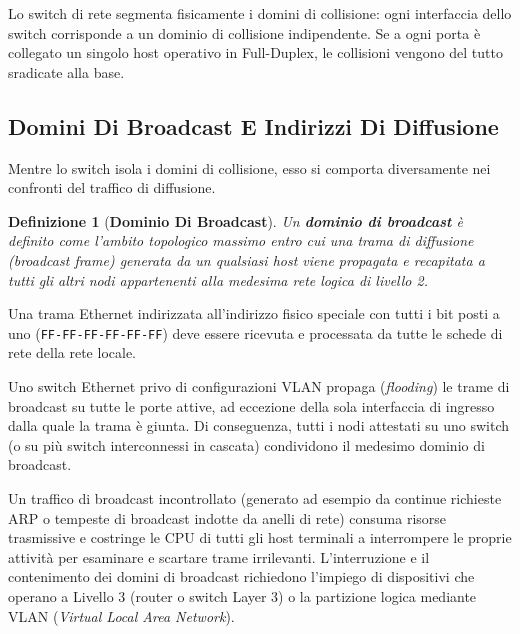 \documentclass[11pt, a4paper]{article}
\newtheorem{theorem}{Definizione}
\begin{document}
Lo switch di rete segmenta fisicamente i domini di collisione: ogni interfaccia dello switch corrisponde a un dominio di collisione indipendente. Se a ogni porta è collegato un singolo host operativo in Full-Duplex, le collisioni vengono del tutto sradicate alla base.

\subsection{Domini Di Broadcast E Indirizzi Di Diffusione}

Mentre lo switch isola i domini di collisione, esso si comporta diversamente nei confronti del traffico di diffusione.

\begin{theorem}[\textbf{Dominio Di Broadcast}]
Un \textbf{dominio di broadcast} è definito come l'ambito topologico massimo entro cui una trama di diffusione (\emph{broadcast frame}) generata da un qualsiasi host viene propagata e recapitata a tutti gli altri nodi appartenenti alla medesima rete logica di livello 2.
\end{theorem}


Una trama Ethernet indirizzata all'indirizzo fisico speciale con tutti i bit posti a uno (\texttt{FF-FF-FF-FF-FF-FF}) deve essere ricevuta e processata da tutte le schede di rete della rete locale.

Uno switch Ethernet privo di configurazioni VLAN propaga (\emph{flooding}) le trame di broadcast su tutte le porte attive, ad eccezione della sola interfaccia di ingresso dalla quale la trama è giunta. Di conseguenza, tutti i nodi attestati su uno switch (o su più switch interconnessi in cascata) condividono il medesimo dominio di broadcast.

Un traffico di broadcast incontrollato (generato ad esempio da continue richieste ARP o tempeste di broadcast indotte da anelli di rete) consuma risorse trasmissive e costringe le CPU di tutti gli host terminali a interrompere le proprie attività per esaminare e scartare trame irrilevanti. L'interruzione e il contenimento dei domini di broadcast richiedono l'impiego di dispositivi che operano a Livello 3 (router o switch Layer 3) o la partizione logica mediante VLAN (\emph{Virtual Local Area Network}).
\end{document}

